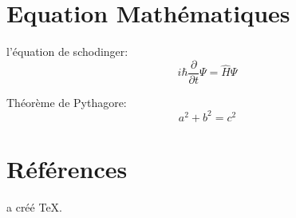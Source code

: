 \documentclass{article}
\begin{document}
	\section{Equation Mathématiques}
	l'équation de schodinger: 
	\begin{equation}
		i\hbar\frac{\partial}{\partial t}\Psi= \hat{H}\Psi
	\end{equation}
	
	Théorème de Pythagore:
	\[
		a^2 + b^2 = c^2
	\]
	
	\section{Références}
	\cite{knuth1984texbook} a créé \TeX.
	
	
	
		
\end{document}
